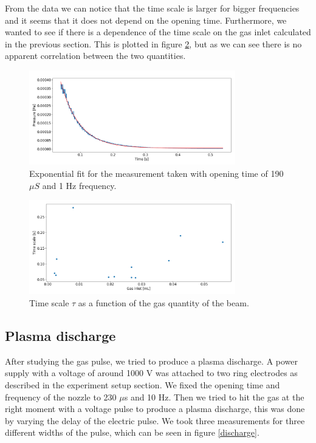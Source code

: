 \documentclass[a4paper,10pt]{article}
\begin{document}
From the data we can notice that the time scale is larger for bigger frequencies and it seems that it does not depend on the opening time. Furthermore, we wanted to see if there is a dependence of the time scale on the gas inlet calculated in the previous section. This is plotted in figure \ref{gasinlettimescale}, but as we can see there is no apparent correlation between the two quantities.

\begin{figure}[H]
\centering
\includegraphics[width = 0.8\textwidth]{expfit}
\caption{Exponential fit for the measurement taken with opening time of 190 $\mu S$ and 1 Hz frequency.}\label{expfit}
\end{figure}

\begin{figure}[H]
\centering
\includegraphics[width = 0.8\textwidth]{gasinlettimescale}
\caption{Time scale $\tau$ as a function of the gas quantity of the beam.}\label{gasinlettimescale}
\end{figure}

\subsection{Plasma discharge}
After studying the gas pulse, we tried to produce a plasma discharge. A power supply with a voltage of around 1000 V was attached to two ring electrodes as described in the experiment setup section. We fixed the opening time and frequency of the nozzle to 230 $\mu$s and 10 Hz. Then we tried to hit the gas at the right moment with a voltage pulse to produce a plasma discharge, this was done by varying the delay of the electric pulse. We took three measurements for three different widths of the pulse, which can be seen in figure \ref{discharge}. 
\end{document}
